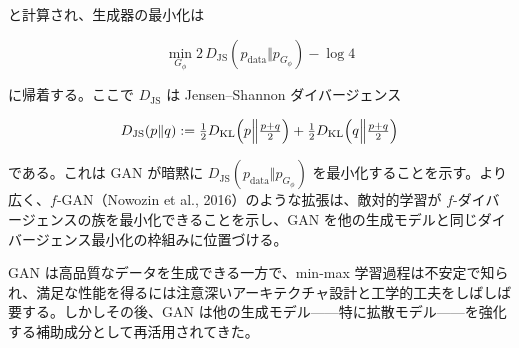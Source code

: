 と計算され、生成器の最小化は

\[
\min_{G_\phi} 2\, D_{\mathrm{JS}}(p_{\mathrm{data}}\Vert p_{G_\phi})-\log 4
\]


に帰着する。ここで $D_{\mathrm{JS}}$ は Jensen–Shannon ダイバージェンス

\[
D_{\mathrm{JS}}(p\Vert q):=\tfrac12 D_{\mathrm{KL}}\Bigl(p\Big\Vert\tfrac{p+q}{2}\Bigr)
+\tfrac12 D_{\mathrm{KL}}\Bigl(q\Big\Vert\tfrac{p+q}{2}\Bigr)
\]


である。これは GAN が暗黙に $D_{\mathrm{JS}}(p_{\mathrm{data}}\Vert p_{G_\phi})$ を最小化することを示す。より広く、$f$-GAN（Nowozin et al., 2016）のような拡張は、敵対的学習が $f$-ダイバージェンスの族を最小化できることを示し、GAN を他の生成モデルと同じダイバージェンス最小化の枠組みに位置づける。

GAN は高品質なデータを生成できる一方で、min-max 学習過程は不安定で知られ、満足な性能を得るには注意深いアーキテクチャ設計と工学的工夫をしばしば要する。しかしその後、GAN は他の生成モデル——特に拡散モデル——を強化する補助成分として再活用されてきた。

